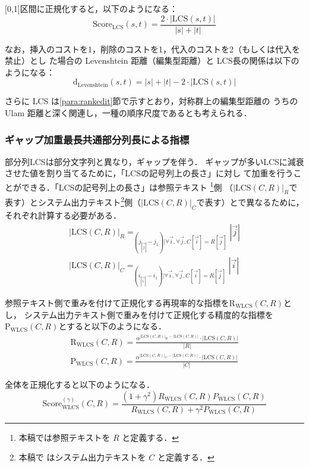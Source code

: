 \documentclass[japanese]{jnlp_1.4}
\newcommand{\argmax}{}
\newcommand{\modified}[1]{}
\begin{document}
[0,1]区間に正規化すると，以下のようになる：
\[
\mbox{Score}_{\mbox{LCS}}(s,t) = \frac{2\cdot|\mbox{LCS}(s,t)|}{|s|+|t|}
\]

なお，挿入のコストを1，削除のコストを1，代入のコストを2（もしくは代入を禁止）とし
た場合の Levenshtein 距離（編集型距離）と LCS長の関係は以下のようになる：
\[
\mbox{d}_{\mbox{Levenshtein}}(s,t) = |s| + |t| - 2 \cdot |\mbox{LCS}(s,t)|
\]

さらに LCS は\ref{para:rankedit}節で示すとおり，対称群上の編集型距離の
うちの Ulam 距離と深く関連し，一種の順序尺度であるとも考えられる．


\subsubsection{ギャップ加重最長共通部分列長による指標}
\label{sss:WLCS}

部分列LCSは部分文字列\modified{LCSubstr}と異なり，ギャップを伴う．
ギャップが多いLCSに減衰させた値を割り当てるために，「LCSの記号列上の長さ」に対し
て加重を行うことができる．「LCSの記号列上の長さ」は参照テキスト
\footnote{本稿では参照テキストを $R$ と定義する．}側
（$|\mbox{LCS}(C,R)|_{R}$で表す）とシステム出力テキスト\footnote{本稿で
はシステム出力テキストを $C$ と定義する．}側（$|\mbox{LCS}(C,R)|_{C}$で表す）とで異なるために，それぞれ計算する必要がある．
\begin{gather*}
 |\mbox{LCS}(C,R)|_{R} = \argmax_{(j_{|\vec{j}|} - j_{1}) |\forall \vec{i}, \forall \vec{j}, C[\vec{i}]=R[\vec{j}]} |\vec{j}|\\
 |\mbox{LCS}(C,R)|_{C} = \argmax_{(i_{|\vec{i}|} - i_{1}) |\forall \vec{i}, \forall \vec{j}, C[\vec{i}]=R[\vec{j}]} |\vec{i}|
\end{gather*}

参照テキスト側で重みを付けて正規化する再現率的な指標を$\mbox{R}_{\mbox{WLCS}}(C,R)$とし，
システム出力テキスト側で重みを付けて正規化する精度的な指標を$\mbox{P}_{\mbox{WLCS}}(C,R)$とすると以下のようになる．
\begin{gather*}
 \mbox{R}_{\mbox{WLCS}}(C,R) =
\frac{\alpha^{|\mbox{LCS}(C,R)|_{R}-|\mbox{LCS}(C,R)|} \cdot
|\mbox{LCS}(C,R)|}{|R|} \\[1ex]
\mbox{P}_{\mbox{WLCS}}(C,R) = \frac{\alpha^{|\mbox{LCS}(C,R)|_{C}-|\mbox{LCS}(C,R)|} \cdot|\mbox{LCS}(C,R)|}{|C|}
\end{gather*}

全体を正規化すると以下のようになる．
\[
\mbox{Score}^{(\gamma)}_{\mbox{WLCS}}(C,R) = \frac{(1+\gamma^{2})R_{\mbox{WLCS}}(C,R) P_{\mbox{WLCS}}(C,R)}{R_{\mbox{WLCS}}(C,R)+\gamma^{2}P_{\mbox{WLCS}}(C,R)} 
\]
\end{document}
